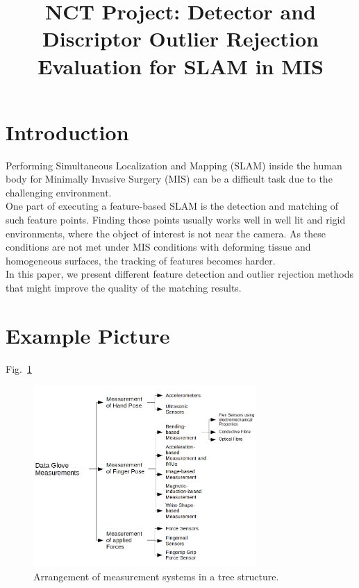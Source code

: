\documentclass[conference]{IEEEtran}
\begin{document}
\title{NCT Project: Detector and Discriptor Outlier Rejection Evaluation for SLAM in MIS\\
}

\author{
\and
{}
\and
{}
}

\maketitle

\begin{abstract}
\end{abstract}

\section{Introduction}
Performing Simultaneous Localization and Mapping (SLAM) inside the human body for Minimally Invasive Surgery (MIS) can be a difficult task due to the challenging environment. \\
One part of executing a feature-based SLAM is the detection and matching of such feature points. Finding those points usually works well in well lit and rigid environments, where the object of interest is not near the camera. As these conditions are not met under MIS conditions with deforming tissue and homogeneous surfaces, the tracking of features becomes harder. \cite{chen_slam_2019} \\
In this paper, we present different feature detection and outlier rejection methods that might improve the quality of the matching results. 

\section{Example Picture}
Fig.~\ref{tree}

\begin{figure}[htbp]
\centerline{\includegraphics[width = 8.5cm]{Pictures/Tree.png}}
\caption{Arrangement of measurement systems in a tree structure.}
\label{tree}
\end{figure}
\end{document}
